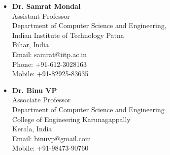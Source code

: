 \documentclass[12pt]{res} %
\begin{document}
\begin{resume}
\begin{itemize}
\item \textbf {Dr. Samrat Mondal}\\ Assistant Professor\\ Department of Computer Science and Engineering, \\ Indian Institute of Technology Patna \\ Bihar, India\\
Email: samrat@iitp.ac.in \\
Phone: +91-612-3028163 \\
Mobile: +91-82925-83635

\vspace{6pt}
\item \textbf {Dr. Binu VP}\\ Associate Professor\\ Department of Computer Science and Engineering \\ College of Engineering Karunagappally \\ Kerala, India \\
Email: binuvp@gmail.com \\
Mobile: +91-98473-90760

\end{itemize}


\end{resume} 
\end{document}
